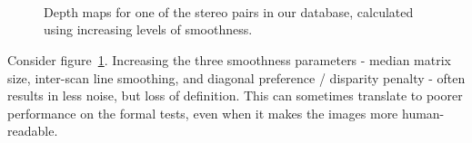 \begin{figure}[p]
 \centering
 \\
 \\
 \\
 \caption[Depth maps for stereo pairs created with various parameters]{Depth
   maps for one of the stereo pairs in our database, calculated using increasing
   levels of smoothness.}
 \label{fig:stereo-pair-depth-maps}
\end{figure}

Consider figure~\ref{fig:stereo-pair-depth-maps}. Increasing the three
smoothness parameters - median matrix size, inter-scan line smoothing, and
diagonal preference / disparity penalty - often results in less noise, but loss
of definition. This can sometimes translate to poorer performance on the
formal tests, even when it makes the images more human-readable.
\clearpage
